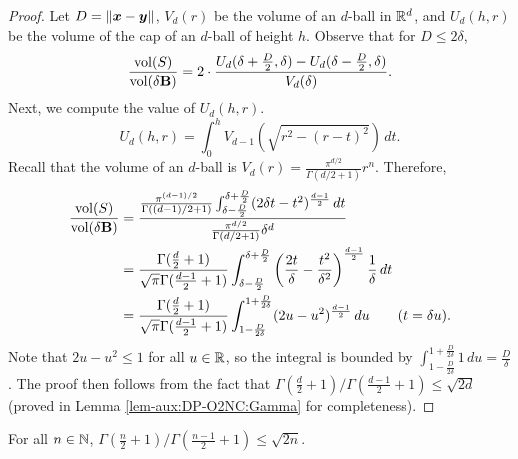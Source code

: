 \begin{proof}
Let $D=\|{\boldsymbol{x}}-{\boldsymbol{y}}\|$, $V_d(r)$ be the volume of an $d$-ball in $\mathbb R^d$, and $U_d(h,r)$ be the volume of the cap of an $d$-ball of height $h$. Observe that for $D\le 2\delta$,
\begin{equation*}
    \frac{\operatorname{vol}(S)}{\operatorname{vol}(\delta{\mathbf{B}})} = 2\cdot \frac{U_d(\delta+\frac{D}{2},\delta) - U_d(\delta-\frac{D}{2},\delta)}{V_d(\delta)}.
\end{equation*}
Next, we compute the value of $U_d(h,r)$.
\begin{equation*}
    U_d(h,r) = \int_0^h V_{d-1}(\sqrt{r^2-(r-t)^2}) \, dt.
\end{equation*}
Recall that the volume of an $d$-ball is $V_d(r) = \frac{\pi^{d/2}}{\Gamma(d/2+1)}r^n$. Therefore,
\begin{align*}
    \frac{\operatorname{vol}(S)}{\operatorname{vol}(\delta{\mathbf{B}})}
    &= \frac{\frac{\pi^{(d-1)/2}}{\Gamma((d-1)/2+1)} \int_{\delta-\frac{D}{2}}^{\delta+\frac{D}{2}} (2\delta t - t^2)^{\frac{d-1}{2}} \, dt}{\frac{\pi^{d/2}}{\Gamma(d/2+1)} \delta^d} \\
    &= \frac{\Gamma(\frac{d}{2}+1)}{\sqrt{\pi}\Gamma(\frac{d-1}{2}+1)} \int_{\delta-\frac{D}{2}}^{\delta+\frac{D}{2}} \left(\frac{2t}{\delta} - \frac{t^2}{\delta^2} \right)^{\frac{d-1}{2}} \frac{1}{\delta} \, dt \\
    &= \frac{\Gamma(\frac{d}{2}+1)}{\sqrt{\pi}\Gamma(\frac{d-1}{2}+1)} \int_{1-\frac{D}{2\delta}}^{1+\frac{D}{2\delta}} (2u-u^2)^{\frac{d-1}{2}} \, du  \tag{$t=\delta u$}.
\end{align*}
Note that $2u-u^2 \le 1$ for all $u\in\mathbb R$, so the integral is bounded by $\int_{1-\frac{D}{2\delta}}^{1+\frac{D}{2\delta}} 1 \, du = \frac{D}{\delta}$. The proof then follows from the fact that $\Gamma(\frac{d}{2}+1)/\Gamma(\frac{d-1}{2}+1) \le \sqrt{2d}$ (proved in Lemma \ref{lem-aux:DP-O2NC:Gamma} for completeness).
\end{proof}

\begin{lemma}
\label{lem-aux:DP-O2NC:Gamma}
For all $n\in\mathbb N$, $\Gamma(\frac{n}{2}+1)/\Gamma(\frac{n-1}{2}+1) \le \sqrt{2n}$.
\end{lemma}

